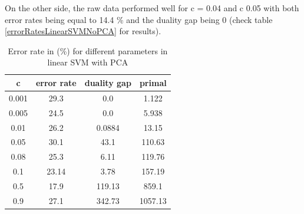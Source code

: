 \documentclass[twoside,a4paper,12pt]{report}
\begin{document}
On the other side, the raw data performed well for c = 0.04 and c 0.05
with both error rates being equal to 14.4 \% and the duality gap being 0
 (check table \ref{errorRatesLinearSVMNoPCA} for results).

\begin{table}[H]
    \centering
     \begin{tabular}{||c c c c||} 
        \hline \hline
            	 c 	& error rate &	 duality gap &	 primal \\ 
                 \hline
            	0.001	&   29.3 &	 0.0 	& 1.122 \\
                \hline
            	0.005 &   24.5 	& 0.0 &	 5.938 \\
                \hline
            	0.01	&   26.2 	 &0.0884 	& 13.15 \\
                \hline
            	0.05	&   30.1 	& 43.1	& 110.63 \\
                \hline
            	0.08	&   25.3 &	 6.11 &	 119.76 \\
                \hline
            	0.1	    &   23.14 	& 3.78	& 157.19 \\
                \hline
            	0.5	&    \cellcolor{blue!25} 17.9	& \cellcolor{red!25} 119.13	& 859.1 \\
                \hline
             	0.9	&   27.1 	& 342.73 	& 1057.13 \\
        \hline \hline
    \end{tabular}
    \caption{Error rate in (\%) for different parameters in linear SVM with PCA \label{errorRatesLinearSVM}}
\end{table}    
\end{document}
